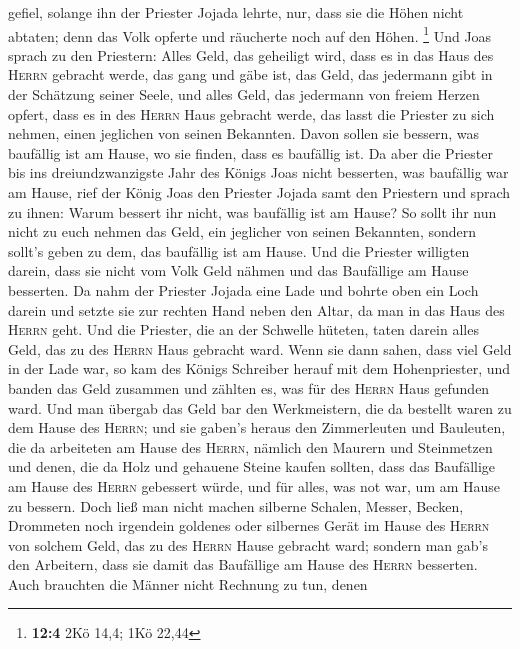 gefiel, solange ihn der Priester Jojada lehrte,  nur, dass
sie die Höhen nicht abtaten; denn das Volk opferte und räucherte noch
auf den Höhen. \footnote{\textbf{12:4} 2Kö 14,4; 1Kö 22,44}
 Und Joas sprach zu den Priestern: Alles Geld, das
geheiligt wird, dass es in das Haus des \textsc{Herrn} gebracht werde,
das gang und gäbe ist, das Geld, das jedermann gibt in der Schätzung
seiner Seele, und alles Geld, das jedermann von freiem Herzen opfert,
dass es in des \textsc{Herrn} Haus gebracht werde,  das
lasst die Priester zu sich nehmen, einen jeglichen von seinen Bekannten.
Davon sollen sie bessern, was baufällig ist am Hause, wo sie finden,
dass es baufällig ist.  Da aber die Priester bis ins
dreiundzwanzigste Jahr des Königs Joas nicht besserten, was baufällig
war am Hause,  rief der König Joas den Priester Jojada
samt den Priestern und sprach zu ihnen: Warum bessert ihr nicht, was
baufällig ist am Hause? So sollt ihr nun nicht zu euch nehmen das Geld,
ein jeglicher von seinen Bekannten, sondern sollt's geben zu dem, das
baufällig ist am Hause.  Und die Priester willigten
darein, dass sie nicht vom Volk Geld nähmen und das Baufällige am Hause
besserten.  Da nahm der Priester Jojada eine Lade und
bohrte oben ein Loch darein und setzte sie zur rechten Hand neben den
Altar, da man in das Haus des \textsc{Herrn} geht. Und die Priester, die
an der Schwelle hüteten, taten darein alles Geld, das zu des
\textsc{Herrn} Haus gebracht ward.  Wenn sie dann sahen,
dass viel Geld in der Lade war, so kam des Königs Schreiber herauf mit
dem Hohenpriester, und banden das Geld zusammen und zählten es, was für
des \textsc{Herrn} Haus gefunden ward.  Und man übergab
das Geld bar den Werkmeistern, die da bestellt waren zu dem Hause des
\textsc{Herrn}; und sie gaben's heraus den Zimmerleuten und Bauleuten,
die da arbeiteten am Hause des \textsc{Herrn},  nämlich
den Maurern und Steinmetzen und denen, die da Holz und gehauene Steine
kaufen sollten, dass das Baufällige am Hause des \textsc{Herrn}
gebessert würde, und für alles, was not war, um am Hause zu bessern.
 Doch ließ man nicht machen silberne Schalen, Messer,
Becken, Drommeten noch irgendein goldenes oder silbernes Gerät im Hause
des \textsc{Herrn} von solchem Geld, das zu des \textsc{Herrn} Hause
gebracht ward;  sondern man gab's den Arbeitern, dass sie
damit das Baufällige am Hause des \textsc{Herrn} besserten.
 Auch brauchten die Männer nicht Rechnung zu tun, denen
